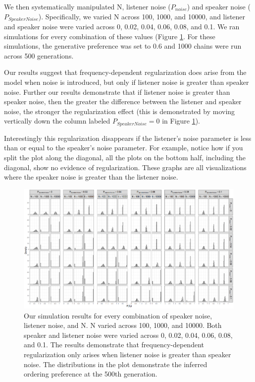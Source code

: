 \documentclass[10pt, letterpaper]{article}
\newenvironment{CodeChunk}{}{}
\begin{document}
We then systematically manipulated N, listener noise (\(P_{noise}\)) and
speaker noise (\(P_{SpeakerNoise}\)). Specifically, we varied N across
100, 1000, and 10000, and listener and speaker noise were varied across
0, 0.02, 0.04, 0.06, 0.08, and 0.1. We ran simulations for every
combination of these values (Figure \ref{fig:fullsimsplot}. For these
simulations, the generative preference was set to 0.6 and 1000 chains
were run across 500 generations.

Our results suggest that frequency-dependent regularization does arise
from the model when noise is introduced, but only if listener noise is
greater than speaker noise. Further our results demonstrate that if
listener noise is greater than speaker noise, then the greater the
difference between the listener and speaker noise, the stronger the
regularization effect (this is demonstrated by moving vertically down
the column labeled \(P_{SpeakerNoise} = 0\) in Figure
\ref{fig:fullsimsplot}).

Interestingly this regularization disappears if the listener's noise
parameter is less than or equal to the speaker's noise parameter. For
example, notice how if you split the plot along the diagonal, all the
plots on the bottom half, including the diagonal, show no evidence of
regularization. These graphs are all visualizations where the speaker
noise is greater than the listener noise.

\begin{CodeChunk}
\begin{figure}[tb]
\includegraphics[width=1\linewidth]{Figures/full_graph} \caption[Our simulation results for every combination of speaker noise, listener noise, and N]{Our simulation results for every combination of speaker noise, listener noise, and N. N varied across 100, 1000, and 10000. Both speaker and listener noise were varied across 0, 0.02, 0.04, 0.06, 0.08, and 0.1. The results demonstrate that frequency-dependent regularization only arises when listener noise is greater than speaker noise. The distributions in the plot demonstrate the inferred ordering preference at the 500th generation.}\label{fig:fullsimsplot}
\end{figure}
\end{CodeChunk}
\end{document}

